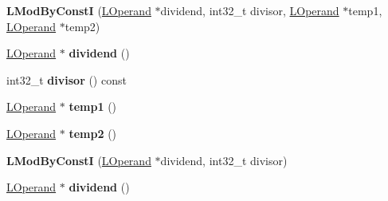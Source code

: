 \begin{DoxyCompactItemize}
\item 
{\bfseries L\+Mod\+By\+ConstI} (\hyperlink{classv8_1_1internal_1_1_l_operand}{L\+Operand} $\ast$dividend, int32\+\_\+t divisor, \hyperlink{classv8_1_1internal_1_1_l_operand}{L\+Operand} $\ast$temp1, \hyperlink{classv8_1_1internal_1_1_l_operand}{L\+Operand} $\ast$temp2)\hypertarget{classv8_1_1internal_1_1_l_mod_by_const_i_a0aa64ca8d64ffbe21dca974459eeca5c}{}\label{classv8_1_1internal_1_1_l_mod_by_const_i_a0aa64ca8d64ffbe21dca974459eeca5c}

\item 
\hyperlink{classv8_1_1internal_1_1_l_operand}{L\+Operand} $\ast$ {\bfseries dividend} ()\hypertarget{classv8_1_1internal_1_1_l_mod_by_const_i_aeb9656f49d65a07307ea1a8d195f37f9}{}\label{classv8_1_1internal_1_1_l_mod_by_const_i_aeb9656f49d65a07307ea1a8d195f37f9}

\item 
int32\+\_\+t {\bfseries divisor} () const \hypertarget{classv8_1_1internal_1_1_l_mod_by_const_i_a3c44698a4d3f5b97d2d382e3d63510e3}{}\label{classv8_1_1internal_1_1_l_mod_by_const_i_a3c44698a4d3f5b97d2d382e3d63510e3}

\item 
\hyperlink{classv8_1_1internal_1_1_l_operand}{L\+Operand} $\ast$ {\bfseries temp1} ()\hypertarget{classv8_1_1internal_1_1_l_mod_by_const_i_aabd5104c1bee0961a7b736ab37c10a79}{}\label{classv8_1_1internal_1_1_l_mod_by_const_i_aabd5104c1bee0961a7b736ab37c10a79}

\item 
\hyperlink{classv8_1_1internal_1_1_l_operand}{L\+Operand} $\ast$ {\bfseries temp2} ()\hypertarget{classv8_1_1internal_1_1_l_mod_by_const_i_a06f95f7010599c83bd9b16e5dfc293d2}{}\label{classv8_1_1internal_1_1_l_mod_by_const_i_a06f95f7010599c83bd9b16e5dfc293d2}

\item 
{\bfseries L\+Mod\+By\+ConstI} (\hyperlink{classv8_1_1internal_1_1_l_operand}{L\+Operand} $\ast$dividend, int32\+\_\+t divisor)\hypertarget{classv8_1_1internal_1_1_l_mod_by_const_i_a16e115d0d70a78dde77a10e073734347}{}\label{classv8_1_1internal_1_1_l_mod_by_const_i_a16e115d0d70a78dde77a10e073734347}

\item 
\hyperlink{classv8_1_1internal_1_1_l_operand}{L\+Operand} $\ast$ {\bfseries dividend} ()\hypertarget{classv8_1_1internal_1_1_l_mod_by_const_i_aeb9656f49d65a07307ea1a8d195f37f9}{}\label{classv8_1_1internal_1_1_l_mod_by_const_i_aeb9656f49d65a07307ea1a8d195f37f9}


\end{DoxyCompactItemize}
